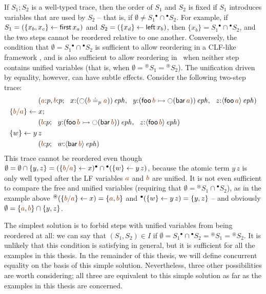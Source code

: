 If $S_1; S_2$ is a well-typed trace, then the order of $S_1$ and $S_2$
is fixed if $S_1$ introduces variables that are used by $S_2$ -- that
is, if $\emptyset \neq S_1{^\bullet} \cap {^\bullet}S_2$. For example,
if $S_1 = (\{{x_b, x_c}\} \leftarrow {\sf first}\,x_a)$ and $S_2 =
(\{{x_d}\} \leftarrow {\sf left}\,x_b)$, then $\{x_b\} = S_1{^\bullet} \cap
{^\bullet}S_2$, and the two steps cannot be reordered relative to one
another.  Conversely, the condition that $\emptyset = S_1{^\bullet}
\cap {^\bullet}S_2$ is sufficient to allow reordering in a CLF-like
framework \cite{cervesato12trace}, and is also sufficient to allow
reordering in \sls~when neither step contains unified variables
(that is, when $\emptyset = {^\circledast}S_1 = {^\circledast}S_2$).
The unification driven by equality, however, can have subtle
effects. Consider the following two-step trace:
\begin{align*}
& \qquad\qquad
(\lf{a}{:}p, \lf{b}{:}p; ~~ x{:}\iseph{\left({\ocircle}(\lf{b} \doteq_p \lf{a})\right)}, ~~
 y{:}\iseph{\left({\sf foo}\,\lf{b} 
                 \lefti {\ocircle}({\sf bar}\, \lf{a})\right)}, ~~
 z{:}\iseph{\susp{{\sf foo}\,\lf{a}}})
\\
& \trstep{\lf{b/a}}{x};
\\
& \qquad\qquad
(\lf{b}{:}p; ~~ 
 y{:}\iseph{\left({\sf foo}\,\lf{b} 
                 \lefti {\ocircle}({\sf bar}\, \lf{b})\right)}, ~~
 z{:}\iseph{\susp{{\sf foo}\,\lf{b}}})
\\
& \trstep{w}{y\,z} 
\\
& \qquad\qquad
(\lf{b}{:}p; ~~ w{:}\iseph{\susp{{\sf bar}\,\lf{b}}})
\end{align*}
This trace cannot be reordered even though $\emptyset = \emptyset \cap
\{ y, z \} = (\trstep{\lf{b/a}}{x}){^\bullet} \cap
{^\bullet}(\trstep{w}{y\,z})$, because the atomic term $y\,z$ is only
well typed after the LF variables $\lf{a}$ and $\lf{b}$ are unified.
It is not even sufficient to compare the free and unified variables
(requiring that $\emptyset = {^\circledast}S_1 \cap {^\bullet}S_2$),
as in the example above ${^\circledast}(\trstep{\lf{b/a}}{x}) = \{
\lf{a},\lf{b} \}$ and ${^\bullet}(\{{w}\} \leftarrow {y\,z}) = \{ y, z \}$ --
and obviously $\emptyset = \{ \lf{a},\lf{b} \} \cap \{ y, z \}$.


The simplest solution is to forbid steps with unified variables from
being reordered at all: we can say that $(S_1,S_2) \in I$ if
$\emptyset = S_1{^\bullet} \cap {^\bullet}S_2 = {^\circledast}S_1 =
{^\circledast}S_2$. It is unlikely that this condition is satisfying
in general, but it is sufficient for all the examples in this
thesis. In the remainder of this thesis, we will define concurrent
equality on the basis of this simple solution.  Nevertheless, three
other possibilities are worth considering; all three are
equivalent to this simple solution as far as the examples in this
thesis are concerned.

